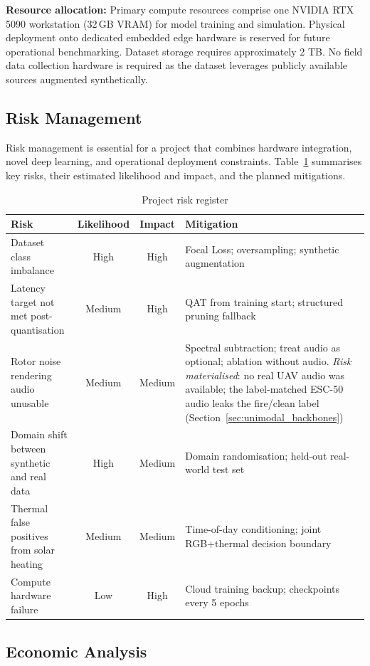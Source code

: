 \documentclass[journal]{IEEEtran}
\begin{document}
\textbf{Resource allocation:} Primary compute resources comprise one NVIDIA RTX 5090 workstation (32\,GB VRAM) for model training and simulation. Physical deployment onto dedicated embedded edge hardware is reserved for future operational benchmarking. Dataset storage requires approximately 2 TB. No field data collection hardware is required as the dataset leverages publicly available sources augmented synthetically.

\subsection{Risk Management}

Risk management is essential for a project that combines hardware integration, novel deep learning, and operational deployment constraints. Table~\ref{tab:risk_register} summarises key risks, their estimated likelihood and impact, and the planned mitigations.

\begin{table}[!t]
\centering
\caption{Project risk register}
\label{tab:risk_register}
\begin{tabular}{@{}p{4cm}ccp{4.5cm}@{}}
\toprule
\textbf{Risk} & \textbf{Likelihood} & \textbf{Impact} & \textbf{Mitigation} \\
\midrule
Dataset class imbalance & High & High & Focal Loss; oversampling; synthetic augmentation \\
Latency target not met post-quantisation & Medium & High & QAT from training start; structured pruning fallback \\
Rotor noise rendering audio unusable & Medium & Medium & Spectral subtraction; treat audio as optional; ablation without audio. \textit{Risk materialised}: no real UAV audio was available; the label-matched ESC-50 audio leaks the fire/clean label (Section~\ref{sec:unimodal_backbones}) \\
Domain shift between synthetic and real data & High & Medium & Domain randomisation; held-out real-world test set \\
Thermal false positives from solar heating & Medium & Medium & Time-of-day conditioning; joint RGB+thermal decision boundary \\
Compute hardware failure & Low & High & Cloud training backup; checkpoints every 5 epochs \\
\bottomrule
\end{tabular}
\end{table}

\subsection{Economic Analysis}
\end{document}

